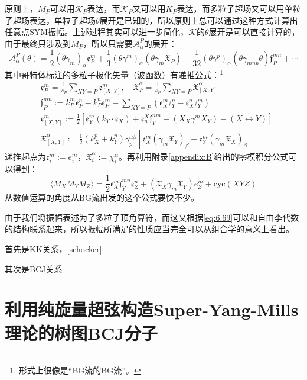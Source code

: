 原则上，$M_P$可以用$\mathcal{K}_P$表达，而$\mathcal{K}_P$又可以用$K_P$表达，而多粒子超场又可以用单粒子超场表达，单粒子超场$\theta$展开是已知的，所以原则上总可以通过这种方式计算出任意点SYM振幅。上述过程其实可以进一步简化，$\mathcal{K}$的$\theta$展开是可以直接计算的，由于最终只涉及到$M_P$，所以只需要$\mathcal{A}^P_\alpha$的展开：
\begin{equation}
	\mathcal{A}_\alpha^P(\theta)=\frac{1}{2}(\theta\gamma_m)_\alpha\mathfrak{e}_P^m+\frac{1}{3}(\theta\gamma^m)_\alpha(\theta\gamma_m\mathfrak{X}_P)-\frac{1}{32}(\theta\gamma^p)_\alpha(\theta\gamma_{mnp}\theta)\mathfrak{f}_P^{mn}+\cdots
\end{equation}
其中哥特体标注的多粒子极化矢量（波函数）有递推公式：\footnote{形式上很像是“BG流的BG流”。}
\begin{align*}
	&\mathfrak{e}_P^m=\frac{1}{s_P}\sum_{XY=P}\mathfrak{e}_{[X,Y]}^m,\quad\mathfrak{X}_P^\alpha=\frac{1}{s_P}\sum_{XY=P}\mathfrak{X}_{[X,Y]}^\alpha\\
	&\mathfrak{f}_P^{mn}:=k_P^m\mathfrak{e}_P^n-k_P^n\mathfrak{e}_P^m-\sum_{XY=P}\left(\mathfrak{e}_X^m\mathfrak{e}_Y^n-\mathfrak{e}_X^n\mathfrak{e}_Y^m\right)\\
	&\mathfrak{e}_{[X,Y]}^m:=\frac{1}{2}\left[\mathfrak{e}_Y^m(k_Y\cdot\mathfrak{e}_X)+\mathfrak{e}_n^X\mathfrak{f}_Y^{nm}+( X_X\gamma^m X_Y)-(X\leftrightarrow Y)\right]\\
	& \mathfrak{X}_{[X,Y]}^\alpha:=\frac{1}{2}(k_X^p+k_Y^p)\gamma_p^{\alpha\beta}\left[\mathfrak{e}_X^m(\gamma_m \mathfrak{X}_Y)_\beta-\mathfrak{e}_Y^m(\gamma_m \mathfrak{X}_X)_\beta\right]
\end{align*}
递推起点为$\mathfrak{e}_i^m:=e_i^m$，$\mathfrak{X}_i^\alpha:=\chi_i^\alpha$。再利用附录\ref{appendix:B}给出的零模积分公式可以得到：
\begin{equation}
	\langle M_XM_YM_Z\rangle=\frac{1}{2}\mathfrak{e}_X^m\mathfrak{f}_Y^{mn}\mathfrak{e}_Z^n+(\mathfrak{X}_X\gamma_m\mathfrak{X}_Y)e_Z^m+\mathrm{cyc}(XYZ)
\end{equation}
从数值运算的角度从BG流出发的这个公式要快不少。\cite{Badger:2012uz}

由于我们将振幅表述为了多粒子顶角算符，而这又根据\ref{eq:6.69}可以和自由李代数的结构联系起来，所以振幅所满足的性质应当完全可以从组合学的意义上看出。

首先是KK关系，\ref{schocker}

其次是BCJ关系
\section{利用纯旋量超弦构造Super-Yang-Mills理论的树图BCJ分子}